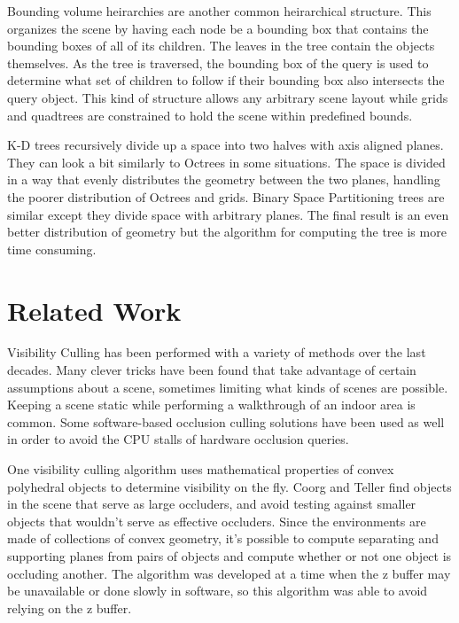 \documentclass[12pt]{ucthesis}
\begin{document}
Bounding volume heirarchies are another common heirarchical structure.\cite{BVH}
This organizes the scene by having each node be a bounding box that contains the bounding boxes of all of its children.
The leaves in the tree contain the objects themselves.
As the tree is traversed, the bounding box of the query is used to determine what set of children to follow if their bounding box also intersects the query object.
This kind of structure allows any arbitrary scene layout while grids and quadtrees are constrained to hold the scene within predefined bounds.

K-D trees recursively divide up a space into two halves with axis aligned planes.\cite{Vis-Computations-Densely-Occluded, Doom3-source-review}
They can look a bit similarly to Octrees in some situations.
The space is divided in a way that evenly distributes the geometry between the two planes, handling the poorer distribution of Octrees and grids.
Binary Space Partitioning trees are similar except they divide space with arbitrary planes.
The final result is an even better distribution of geometry but the algorithm for computing the tree is more time consuming.

\chapter{Related Work}
\label{related-work}

Visibility Culling has been performed with a variety of methods over the last decades.
Many clever tricks have been found that take advantage of certain assumptions about a scene, sometimes limiting what kinds of scenes are possible.
Keeping a scene static while performing a walkthrough of an indoor area is common.
Some software-based occlusion culling solutions have been used as well in order to avoid the CPU stalls of hardware occlusion queries.

One visibility culling algorithm uses mathematical properties of convex polyhedral objects to determine visibility on the fly.\cite{large-occluders}
Coorg and Teller find objects in the scene that serve as large occluders, and avoid testing against smaller objects that wouldn't serve as effective occluders.
Since the environments are made of collections of convex geometry, it's possible to compute separating and supporting planes from pairs of objects and compute whether or not one object is occluding another.
The algorithm was developed at a time when the z buffer may be unavailable or done slowly in software, so this algorithm was able to avoid relying on the z buffer.
\end{document}
